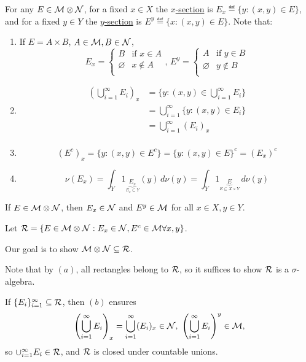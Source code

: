 \documentclass[x11names,reqno,14pt]{extarticle}
\newcommand*{\oo}{\infty}
\newcommand{\seq}[1]{_{#1 = 1}^\oo}
\begin{document}
For any $E \in \mathcal{M}\otimes\mathcal{N}$, for a fixed $x \in X$ the \underline{$x$-section} is $E_x \eqdef \{y: (x, y) \in E\}$, and for a fixed $y \in Y$ the \underline{$y$-section} is $E^y\eqdef\{x: (x, y) \in E\}$. 
Note that: 
\begin{enumerate}[label=(\alph*)]
\item  If $E = A\times B$, $A \in \mathcal{M}, B \in \mathcal{N}$, 
\[
E_x = \begin{cases} B &\text{if }x\in A \\ \varnothing & x\not\in A \\ \end{cases}, \, E^y = \begin{cases} A &\text{if } y\in B \\ \varnothing & y\not\in B \\ \end{cases}
\]
\item 
\begin{align*}
\left(\bigcup\seq{i}E_i\right)_x & = \{y: (x, y) \in \bigcup\seq{i}E_i\} \\
& = \bigcup\seq{i}\{y: (x, y) \in E_i\} \\
& = \bigcup\seq{i}(E_i)_x \\
\end{align*}
\item 
\[
(E^c)_x = \{y: (x, y) \in E^c\} = \{y: (x, y) \in E\}^c = (E_x)^c
\]
\item
\[
\nu(E_x) = \int_Y1_{\underbrace{E_x}_{E_x\subseteq Y}}(y)\,d\nu(y) = \int_Y1_{\underbrace{E}_{E\subseteq X\times Y}}\,d\nu(y)
\]
\end{enumerate}

\prop

If $E \in \mathcal{M}\otimes\mathcal{N}$, then $E_x \in \mathcal{N}$ and $E^y \in \mathcal{M}$ for all $x \in X, y \in Y$. 

\proof

Let $\mathcal{R} = \{E\in\mathcal{M}\otimes\mathcal{N}: E_x \in \mathcal{N}, E^c\in\mathcal{M}\forall x, y\}$. 

Our goal is to show $\mathcal{M}\otimes\mathcal{N}\subseteq\mathcal{R}$. 

Note that by $(a)$, all rectangles belong to $\mathcal{R}$, so it suffices to show $\mathcal{R}$ is a $\sigma$-algebra. 

If $\{E_i\}\seq{i}\subseteq\mc{R}$, then $(b)$ ensures
\[
\left(\bigcup\seq{i}E_i\right)_x = \bigcup\seq{i}(E_i)_x \in \mc{N}, \,\, \left(\bigcup\seq{i}E_i\right)^y \in \mc{M},
\]
so $\cup\seq{i}E_i\in\mc{R}$, and $\mathcal{R}$ is closed under countable unions. 
\end{document}
